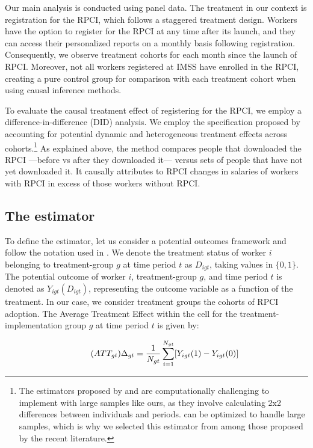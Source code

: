\documentclass[oneside,11pt]{article}
\begin{document}
Our main analysis is conducted using panel data. The treatment in our context is registration for the RPCI, which follows a staggered treatment design. Workers have the option to register for the RPCI at any time after its launch, and they can access their personalized reports on a monthly basis following registration. Consequently, we observe treatment cohorts for each month since the launch of RPCI. Moreover, not all workers registered at IMSS have enrolled in the RPCI, creating a pure control group for comparison with each treatment cohort when using causal inference methods. 

To evaluate the causal treatment effect of registering for the RPCI, we employ a difference-in-difference (DID) analysis. We employ the specification proposed by \cite{de2020two} accounting for potential dynamic and heterogeneous treatment effects across cohorts.\footnote{The estimators proposed by \cite{callaway2021difference} and \cite{sun2021estimating} are computationally challenging to implement with large samples like ours, as they involve calculating 2x2 differences between individuals and periods. \cite{de2020two} can be optimized to handle large samples, which is why we selected this estimator from among those proposed by the recent literature.} As explained above, the method compares people that downloaded the RPCI ---before vs after they downloaded it--- versus sets of people that have not yet downloaded it. It causally attributes to RPCI changes in salaries of workers with RPCI in excess of those workers without RPCI.


\subsection{The estimator}

To define the estimator, let us consider a potential outcomes framework and follow the notation used in \cite{de2020two}. We denote the treatment status of worker $i$ belonging to treatment-group $g$ at time period $t$ as $D_{igt}$, taking values in $\{0,1\}$. The potential outcome of worker $i$, treatment-group $g$, and time period $t$ is denoted as $Y_{igt}(D_{igt})$, representing the outcome variable as a function of the treatment. In our case, we consider treatment groups the cohorts of RPCI adoption. The Average Treatment Effect within the cell for the treatment-implementation group $g$ at time period $t$ is given by:

\begin{equation}
    \tag{$ATT_{gt}$}
    \Delta_{gt} = \frac{1}{N_{gt}} \sum_{i=1}^{N_{gt}} [Y_{igt}(1) - Y_{igt}(0)]
\end{equation}
\end{document}

